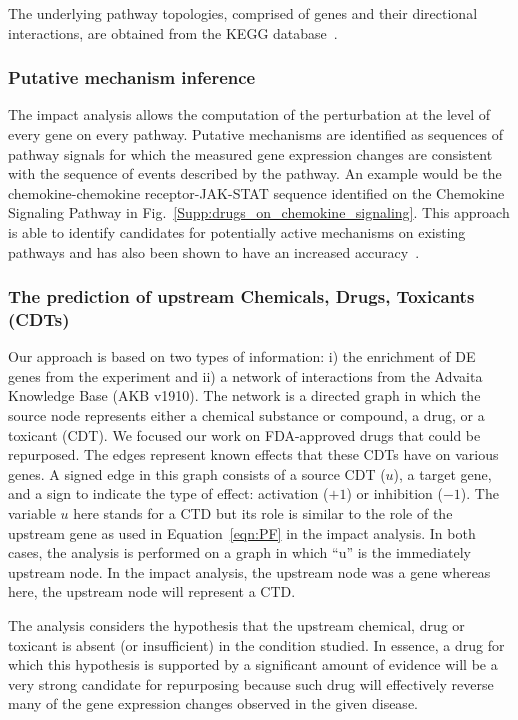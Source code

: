 The underlying pathway topologies, comprised of genes and their directional interactions, are obtained from the KEGG database~\cite{ogata1999kegg, kanehisa2010kegg, kanehisa2012kegg,  kanehisa2014data}.

\subsubsection{Putative mechanism inference} 

The impact analysis  allows the computation of the perturbation at the level of every gene on every pathway. Putative mechanisms are identified as sequences of pathway signals for which the measured gene expression changes are consistent with the sequence of events described by the pathway. An example would be the chemokine-chemokine receptor-JAK-STAT sequence identified on the Chemokine Signaling Pathway  in Fig.~\ref{Supp:drugs_on_chemokine_signaling}. This approach is able to identify candidates for potentially active mechanisms on existing pathways and has also been shown to have an increased accuracy~\cite{nguyen2019identifying}. %


\subsubsection{The prediction of upstream Chemicals, Drugs, Toxicants (CDTs)}  

Our approach is based on two types of information: i) the enrichment of DE genes from the experiment and ii) a network of interactions from the Advaita Knowledge Base (AKB v1910). The network is a directed graph in which the source node represents either a chemical substance or compound, a drug, or a toxicant (CDT). We focused our work on FDA-approved drugs that could be repurposed. The edges represent known effects that these CDTs have on various genes. A signed edge in this graph consists of a source CDT ($u$), a target gene, and a sign to indicate the type of effect: activation ($+1$) or inhibition ($-1$). 
The variable $u$ here stands for a CTD but its role is similar to the role of the upstream gene as used in Equation~\ref{eqn:PF} in the impact analysis. In both cases, the analysis is performed on a graph in which ``u'' is the immediately upstream node. In the impact analysis, the upstream node was  a gene whereas here, the upstream node will represent a CTD.

The analysis considers the hypothesis that  the upstream chemical, drug or toxicant is absent (or insufficient) in the condition studied. In essence, a drug for which this hypothesis is supported by a significant amount of evidence will be a very strong candidate for repurposing because such drug will effectively reverse many of the gene expression changes observed in the given disease. 


